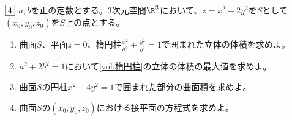 \begin{tcolorbox} %
	$\fbox{4}$ $a, b$を正の定数とする。3次元空間$\R^3$において、$z= x^2+ 2y^2$を$S$として$(x_0, y_0, z_0)$を$S$上の点とする。
\begin{enumerate}
	\item\label{vol:楕円柱} 曲面$S$、平面$z= 0$、楕円柱$\frac{x^2}{a^2}+ \frac{y^2}{b^2}= 1$で囲まれた立体の体積を求めよ。
	\item $a^2 +2b^2= 1$において\ref{vol:楕円柱}の立体の体積の最大値を求めよ。
	\item 曲面$S$の円柱$x^2+ 4y^2= 1$で囲まれた部分の曲面積を求めよ。
	\item 曲面$S$の$(x_0, y_0, z_0)$における接平面の方程式を求めよ。
\end{enumerate}
\end{tcolorbox}


